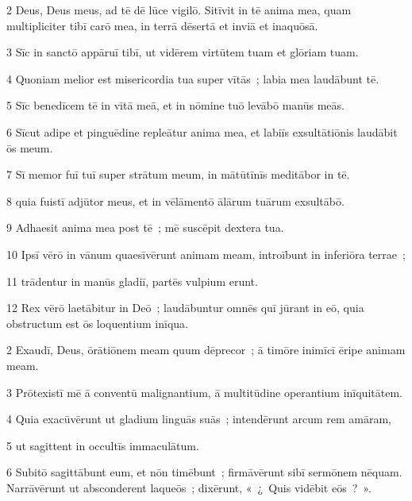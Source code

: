 
\psalmVerse
  {\phantom{00}2}
  {Deus, Deus meus, ad tē dē lūce vigilō. Sitīvit in tē anima mea, quam multipliciter tibī carō mea, in terrā dēsertā et inviā et inaquōsā.}


\psalmVerse
  {\phantom{00}3}
  {Sīc in sanctō appāruī tibī, ut vidērem virtūtem tuam et glōriam tuam.}


\psalmVerse
  {\phantom{00}4}
  {Quoniam melior est misericordia tua super vītās~; labia mea laudābunt tē.}


\psalmVerse
  {\phantom{00}5}
  {Sīc benedīcem tē in vītā meā, et in nōmine tuō levābō manūs meās.}


\psalmVerse
  {\phantom{00}6}
  {Sīcut adipe et pinguēdine repleātur anima mea, et labiīs exsultātiōnis laudābit ōs meum.}


\psalmVerse
  {\phantom{00}7}
  {Sī memor fuī tuī super strātum meum, in mātūtīnīs meditābor in tē.}


\psalmVerse
  {\phantom{00}8}
  {quia fuistī adjūtor meus, et in vēlāmentō ālārum tuārum exsultābō.}


\psalmVerse
  {\phantom{00}9}
  {Adhaesit anima mea post tē~; mē suscēpit dextera tua.}


\psalmVerse
  {\phantom{0}10}
  {Ipsī vērō in vānum quaesīvērunt animam meam, introībunt in inferiōra terrae~;}


\psalmVerse
  {\phantom{0}11}
  {trādentur in manūs gladiī, partēs vulpium erunt.}


\psalmVerse
  {\phantom{0}12}
  {Rex vērō laetābitur in Deō~; laudābuntur omnēs quī jūrant in eō, quia obstructum est ōs loquentium inīqua.}



\psalmVerse
  {\phantom{00}2}
  {Exaudī, Deus, ōrātiōnem meam quum dēprecor~; ā timōre inimīcī ēripe animam meam.}


\psalmVerse
  {\phantom{00}3}
  {Prōtexistī mē ā conventū malignantium, ā multitūdine operantium inīquitātem.}


\psalmVerse
  {\phantom{00}4}
  {Quia exacūvērunt ut gladium linguās suās~; intendērunt arcum rem amāram,}


\psalmVerse
  {\phantom{00}5}
  {ut sagittent in occultīs immaculātum.}


\psalmVerse
  {\phantom{00}6}
  {Subitō sagittābunt eum, et nōn timēbunt~; firmāvērunt sibī sermōnem nēquam. Narrāvērunt ut absconderent laqueōs~; dixērunt, «~¿~Quis vidēbit eōs~?~».}



